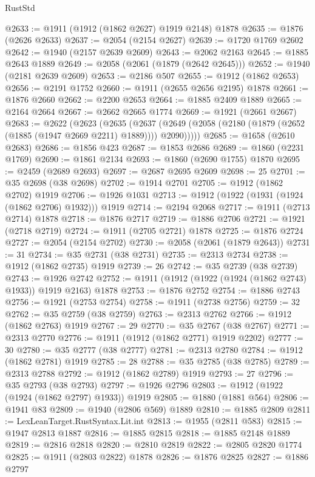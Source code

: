 \begin{lexlean}{RustStd}
\begin{coremodule}
@2633 := @1911 (@1912 (@1862 @2627) @1919 @2148) @1878
@2635 := @1876 (@2626 @2633)
@2637 := @2054 (@2154 @2627)
@2639 := @1720 @1769 @2602
@2642 := @1940 (@2157 @2639 @2609)
@2643 := @2062 @2163
@2645 := @1885 @2643 @1889
@2649 := @2058 (@2061 (@1879 (@2642 @2645)))
@2652 := @1940 (@2181 @2639 @2609)
@2653 := @2186 @507
@2655 := @1912 (@1862 @2653)
@2656 := @2191 @1752
@2660 := @1911 (@2655 @2656 @2195) @1878
@2661 := @1876 @2660
@2662 := @2200 @2653
@2664 := @1885 @2409 @1889
@2665 := @2164 @2664
@2667 := @2662 @2665 @1774
@2669 := @1921 (@2661 @2667)
@2683 := @2622
    (@2623
      (@2635
        (@2637 (@2649 (@2058 (@2180 (@1879 (@2652 (@1885 (@1947 @2669 @2211) @1889)))) @2090)))))
@2685 := @1658 (@2610 @2683)
@2686 := @1856 @423
@2687 := @1853 @2686
@2689 := @1860 (@2231 @1769)
@2690 := @1861 @2134
@2693 := @1860 (@2690 @1755) @1870
@2695 := @2459 (@2689 @2693)
@2697 := @2687 @2695 @2609
@2698 := 25
@2701 := @35 @2698 (@38 @2698)
@2702 := @1914 @2701
@2705 := @1912 (@1862 @2702) @1919
@2706 := @1926 @1031
@2713 := @1912 (@1922 (@1931 (@1924 (@1862 @2706) @1932))) @1919
@2714 := @2194 @2068
@2717 := @1911 (@2713 @2714) @1878
@2718 := @1876 @2717
@2719 := @1886 @2706
@2721 := @1921 (@2718 @2719)
@2724 := @1911 (@2705 @2721) @1878
@2725 := @1876 @2724
@2727 := @2054 (@2154 @2702)
@2730 := @2058 (@2061 (@1879 @2643))
@2731 := 31
@2734 := @35 @2731 (@38 @2731)
@2735 := @2313 @2734
@2738 := @1912 (@1862 @2735) @1919
@2739 := 26
@2742 := @35 @2739 (@38 @2739)
@2743 := @1926 @2742
@2752 := @1911 (@1912 (@1922 (@1924 (@1862 @2743) @1933)) @1919 @2163) @1878
@2753 := @1876 @2752
@2754 := @1886 @2743
@2756 := @1921 (@2753 @2754)
@2758 := @1911 (@2738 @2756)
@2759 := 32
@2762 := @35 @2759 (@38 @2759)
@2763 := @2313 @2762
@2766 := @1912 (@1862 @2763) @1919
@2767 := 29
@2770 := @35 @2767 (@38 @2767)
@2771 := @2313 @2770
@2776 := @1911 (@1912 (@1862 @2771) @1919 @2202)
@2777 := 30
@2780 := @35 @2777 (@38 @2777)
@2781 := @2313 @2780
@2784 := @1912 (@1862 @2781) @1919
@2785 := 28
@2788 := @35 @2785 (@38 @2785)
@2789 := @2313 @2788
@2792 := @1912 (@1862 @2789) @1919
@2793 := 27
@2796 := @35 @2793 (@38 @2793)
@2797 := @1926 @2796
@2803 := @1912 (@1922 (@1924 (@1862 @2797) @1933)) @1919
@2805 := @1880 (@1881 @564)
@2806 := @1941 @83
@2809 := @1940 (@2806 @569) @1889
@2810 := @1885 @2809
@2811 := LexLeanTarget.RustSyntax.Lit.int
@2813 := @1955 (@2811 @583)
@2815 := @1947 @2813 @1887
@2816 := @1885 @2815
@2818 := @1885 @2148 @1889
@2819 := @2816 @2818
@2820 := @2810 @2819
@2822 := @2805 @2820 @1774
@2825 := @1911 (@2803 @2822) @1878
@2826 := @1876 @2825
@2827 := @1886 @2797

\end{coremodule}
\end{lexlean}
